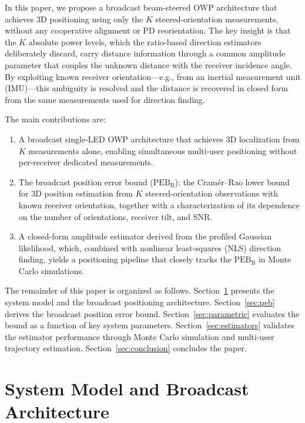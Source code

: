 \documentclass[conference]{IEEEtran}
\begin{document}
In this paper, we propose a broadcast beam-steered OWP architecture that achieves 3D positioning using only the $K$ steered-orientation measurements, without any cooperative alignment or PD reorientation.
The key insight is that the $K$ absolute power levels, which the ratio-based direction estimators deliberately discard, carry distance information through a common amplitude parameter that couples the unknown distance with the receiver incidence angle.
By exploiting known receiver orientation---e.g., from an inertial measurement unit (IMU)---this ambiguity is resolved and the distance is recovered in closed form from the same measurements used for direction finding.

The main contributions are:
\begin{enumerate}
    \item A broadcast single-LED OWP architecture that achieves 3D localization from $K$ measurements alone, enabling simultaneous multi-user positioning without per-receiver dedicated measurements.
    \item The broadcast position error bound ($\mathrm{PEB}_\mathrm{B}$): the Cram\'{e}r--Rao lower bound for 3D position estimation from $K$ steered-orientation observations with known receiver orientation, together with a characterization of its dependence on the number of orientations, receiver tilt, and SNR.
    \item A closed-form amplitude estimator derived from the profiled Gaussian likelihood, which, combined with nonlinear least-squares (NLS) direction finding, yields a positioning pipeline that closely tracks the $\mathrm{PEB}_\mathrm{B}$ in Monte Carlo simulations.
\end{enumerate}

The remainder of this paper is organized as follows.
Section~\ref{sec:system} presents the system model and the broadcast positioning architecture.
Section~\ref{sec:peb} derives the broadcast position error bound.
Section~\ref{sec:parametric} evaluates the bound as a function of key system parameters.
Section~\ref{sec:estimators} validates the estimator performance through Monte Carlo simulation and multi-user trajectory estimation.
Section~\ref{sec:conclusion} concludes the paper.

\section{System Model and Broadcast Architecture}
\label{sec:system}
\end{document}
